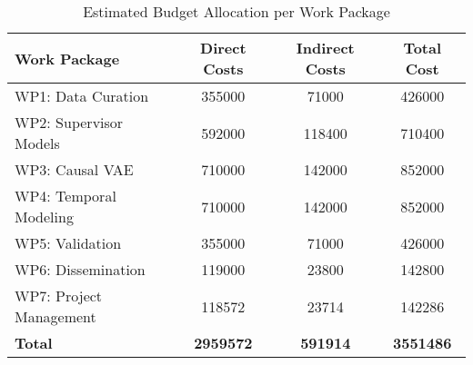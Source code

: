 \begin{table}[H]
\centering
\caption{Estimated Budget Allocation per Work Package}
\label{tab:budget_wp}
\begin{tabular}{lS[table-format=7.0]S[table-format=7.0]S[table-format=7.0]}
\toprule
\textbf{Work Package} & {\textbf{Direct Costs}} & {\textbf{Indirect Costs}} & {\textbf{Total Cost}} \\
\midrule
WP1: Data Curation & 355000 & 71000 & 426000 \\
WP2: Supervisor Models & 592000 & 118400 & 710400 \\
WP3: Causal VAE & 710000 & 142000 & 852000 \\
WP4: Temporal Modeling & 710000 & 142000 & 852000 \\
WP5: Validation & 355000 & 71000 & 426000 \\
WP6: Dissemination & 119000 & 23800 & 142800 \\
WP7: Project Management & 118572 & 23714 & 142286 \\
\midrule
\textbf{Total} & {\textbf{2959572}} & {\textbf{591914}} & {\textbf{3551486}} \\
\bottomrule
\end{tabular}
\end{table}
